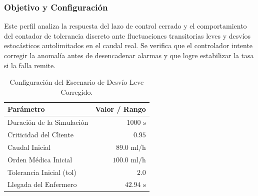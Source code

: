 \documentclass[11pt,a4paper]{article}
\begin{document}
\subsubsection{Objetivo y Configuración}
Este perfil analiza la respuesta del lazo de control cerrado y el comportamiento del contador de tolerancia discreto ante fluctuaciones transitorias leves y desvíos estocásticos autolimitados en el caudal real. Se verifica que el controlador intente corregir la anomalía antes de desencadenar alarmas y que logre estabilizar la tasa si la falla remite.

\begin{table}[H]
    \centering
    \begin{tabular}{lr}
        \toprule
        \textbf{Parámetro} & \textbf{Valor / Rango} \\
        \midrule
        Duración de la Simulación & $1000\text{ s}$ \\
        Criticidad del Cliente & $0.95$ \\
        Caudal Inicial & $89.0\text{ ml/h}$ \\
        Orden Médica Inicial & $100.0\text{ ml/h}$ \\
        Tolerancia Inicial (tol) & $2.0$ \\
        Llegada del Enfermero & $42.94\text{ s}$ \\
        \bottomrule
    \end{tabular}
    \caption{Configuración del Escenario de Desvío Leve Corregido.}
    \label{tab:config_desvio_leve}
\end{table}
\end{document}
